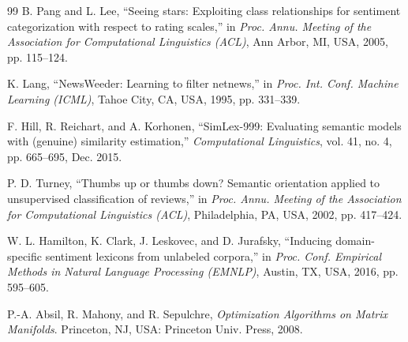 \documentclass[journal]{IEEEtran}
\begin{document}
\begin{thebibliography}{99}
B. Pang and L. Lee, ``Seeing stars: Exploiting class relationships for sentiment categorization with respect to rating scales,'' in \emph{Proc. Annu. Meeting of the Association for Computational Linguistics (ACL)}, Ann Arbor, MI, USA, 2005, pp. 115--124.

K. Lang, ``NewsWeeder: Learning to filter netnews,'' in \emph{Proc. Int. Conf. Machine Learning (ICML)}, Tahoe City, CA, USA, 1995, pp. 331--339.

F. Hill, R. Reichart, and A. Korhonen, ``SimLex-999: Evaluating semantic models with (genuine) similarity estimation,'' \emph{Computational Linguistics}, vol. 41, no. 4, pp. 665--695, Dec. 2015.

P. D. Turney, ``Thumbs up or thumbs down? Semantic orientation applied to unsupervised classification of reviews,'' in \emph{Proc. Annu. Meeting of the Association for Computational Linguistics (ACL)}, Philadelphia, PA, USA, 2002, pp. 417--424.

W. L. Hamilton, K. Clark, J. Leskovec, and D. Jurafsky, ``Inducing domain-specific sentiment lexicons from unlabeled corpora,'' in \emph{Proc. Conf. Empirical Methods in Natural Language Processing (EMNLP)}, Austin, TX, USA, 2016, pp. 595--605.

P.-A. Absil, R. Mahony, and R. Sepulchre, \emph{Optimization Algorithms on Matrix Manifolds}. Princeton, NJ, USA: Princeton Univ. Press, 2008.

\end{thebibliography}
\end{document}
